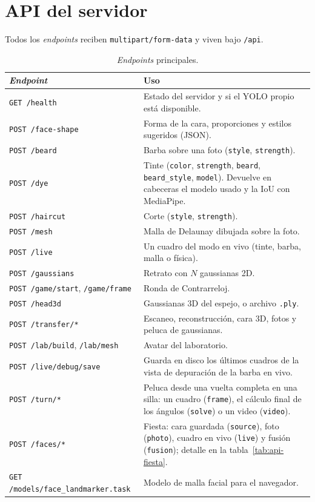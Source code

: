 \section{API del servidor}
\label{sec:anexo-api}

Todos los \emph{endpoints} reciben \texttt{multipart/form-data} y viven bajo \texttt{/api}.

\begin{table}[ht]
\centering
\small
\begin{tabularx}{\linewidth}{@{}l X@{}}
\toprule
\emph{Endpoint} & Uso \\
\midrule
\texttt{GET /health} & Estado del servidor y si el YOLO propio está disponible. \\
\texttt{POST /face-shape} & Forma de la cara, proporciones y estilos sugeridos (JSON). \\
\texttt{POST /beard} & Barba sobre una foto (\texttt{style}, \texttt{strength}). \\
\texttt{POST /dye} & Tinte (\texttt{color}, \texttt{strength}, \texttt{beard}, \texttt{beard\_style}, \texttt{model}). Devuelve en cabeceras el modelo usado y la IoU con MediaPipe. \\
\texttt{POST /haircut} & Corte (\texttt{style}, \texttt{strength}). \\
\texttt{POST /mesh} & Malla de Delaunay dibujada sobre la foto. \\
\texttt{POST /live} & Un cuadro del modo en vivo (tinte, barba, malla o física). \\
\texttt{POST /gaussians} & Retrato con $N$ gaussianas 2D. \\
\texttt{POST /game/start}, \texttt{/game/frame} & Ronda de Contrarreloj. \\
\texttt{POST /head3d} & Gaussianas 3D del espejo, o archivo \texttt{.ply}. \\
\texttt{POST /transfer/*} & Escaneo, reconstrucción, cara 3D, fotos y peluca de gaussianas. \\
\texttt{POST /lab/build}, \texttt{/lab/mesh} & Avatar del laboratorio. \\
\texttt{POST /live/debug/save} & Guarda en disco los últimos cuadros de la vista de depuración de la barba en vivo. \\
\texttt{POST /turn/*} & Peluca desde una vuelta completa en una silla: un cuadro (\texttt{frame}), el cálculo final de los ángulos (\texttt{solve}) o un video (\texttt{video}). \\
\texttt{POST /faces/*} & Fiesta: cara guardada (\texttt{source}), foto (\texttt{photo}), cuadro en vivo (\texttt{live}) y fusión (\texttt{fusion}); detalle en la tabla~\ref{tab:api-fiesta}. \\
\texttt{GET /models/face\_landmarker.task} & Modelo de malla facial para el navegador. \\
\bottomrule
\end{tabularx}
\caption{\emph{Endpoints} principales.}
\end{table}

